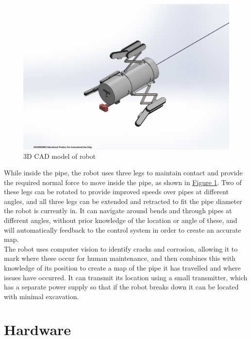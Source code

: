 \documentclass[11pt]{article}		%
\newlength{\imageheight}	 %
\begin{document}
	\begin{figure}[h] %
		\centering
		\includegraphics[height=\imageheight]{overviewCAD}
		\caption{3D CAD model of robot}		%
		\label{3DSketch}
	\end{figure}
	
	While inside the pipe, the robot uses three legs to maintain contact and provide the required normal force to move inside the pipe, as shown in \hyperref[3DSketch]{Figure \ref*{3DSketch}}.
	Two of these legs can be rotated to provide improved speeds over pipes at different angles, and all three legs can be extended and retracted to fit the pipe diameter the robot is currently in.
	It can navigate around bends and through pipes at different angles, without prior knowledge of the location or angle of these, and will automatically feedback to the control system in order to create an accurate map.
	\\
	The robot uses computer vision to identify cracks and corrosion, allowing it to mark where these occur for human maintenance, and then combines this with knowledge of its position to create a map of the pipe it has travelled and where issues have occurred.
	It can transmit its location using a small transmitter, which has a separate power supply so that if the robot breaks down it can be located with minimal excavation.
	
	\section{Hardware}
	
\end{document}
